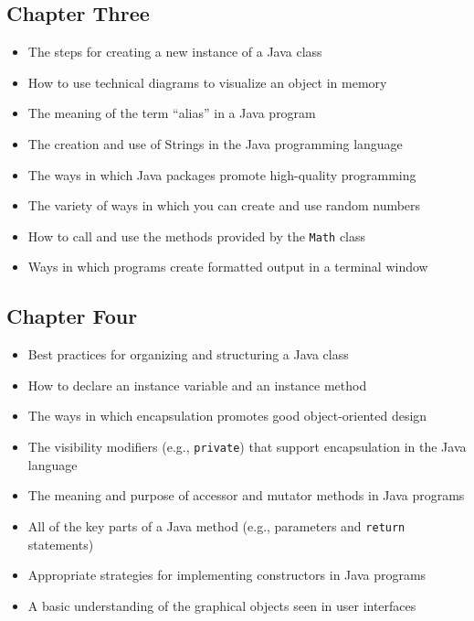 \documentclass[11pt]{article}
\begin{document}
\vspace*{-.25in}
\subsection*{Chapter Three}
\vspace*{-.1in}

\begin{itemize}

  \itemsep -.015in
  \item The steps for creating a new instance of a Java class
  \item How to use technical diagrams to visualize an object in memory
  \item The meaning of the term ``alias'' in a Java program
  \item The creation and use of Strings in the Java programming language
  \item The ways in which Java packages promote high-quality programming
  \item The variety of ways in which you can create and use random numbers
  \item How to call and use the methods provided by the {\tt Math} class
  \item Ways in which programs create formatted output in a terminal window

\end{itemize}

\vspace*{-.25in}
\subsection*{Chapter Four}
\vspace*{-.1in}

\begin{itemize}

  \itemsep -.015in
  \item Best practices for organizing and structuring a Java class
  \item How to declare an instance variable and an instance method
  \item The ways in which encapsulation promotes good object-oriented design
  \item The visibility modifiers (e.g., {\tt private}) that support encapsulation in the Java language
  \item The meaning and purpose of accessor and mutator methods in Java programs
  \item All of the key parts of a Java method (e.g., parameters and {\tt return} statements)
  \item Appropriate strategies for implementing constructors in Java programs
  \item A basic understanding of the graphical objects seen in user interfaces

\end{itemize}
\end{document}
